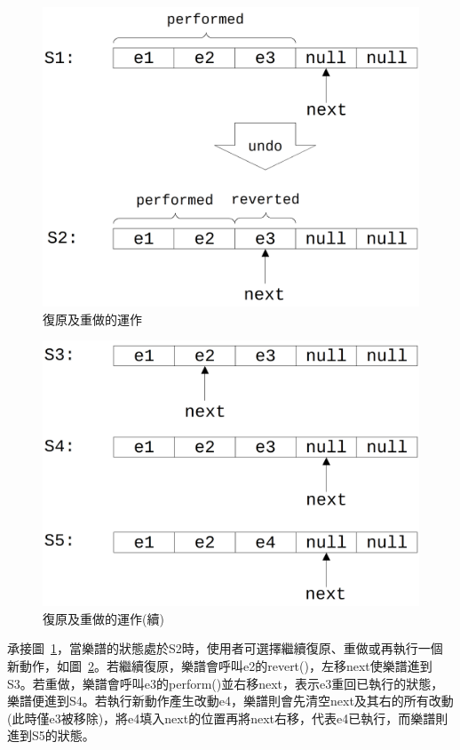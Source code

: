 \documentclass[12pt,a4paper,oneside]{report}
\begin{document}
\begin{figure}[htb]
\centering
\includegraphics[scale=0.1]{img/undo_redo.png}
\caption{ 復原及重做的運作 }
\label{fig:undo_redo}
\end{figure}

\begin{figure}[htb]
\centering
\includegraphics[scale=0.1]{img/undo_redo_cont.png}
\caption{ 復原及重做的運作(續) }
\label{fig:undo_redo_cont}
\end{figure}


承接圖~\ref{fig:undo_redo}，當樂譜的狀態處於S2時，使用者可選擇繼續復原、重做或再執行一個新動作，如圖~\ref{fig:undo_redo_cont}。若繼續復原，樂譜會呼叫e2的revert()，左移next使樂譜進到S3。若重做，樂譜會呼叫e3的perform()並右移next，表示e3重回已執行的狀態，樂譜便進到S4。若執行新動作產生改動e4，樂譜則會先清空next及其右的所有改動(此時僅e3被移除)，將e4填入next的位置再將next右移，代表e4已執行，而樂譜則進到S5的狀態。
\end{document}

